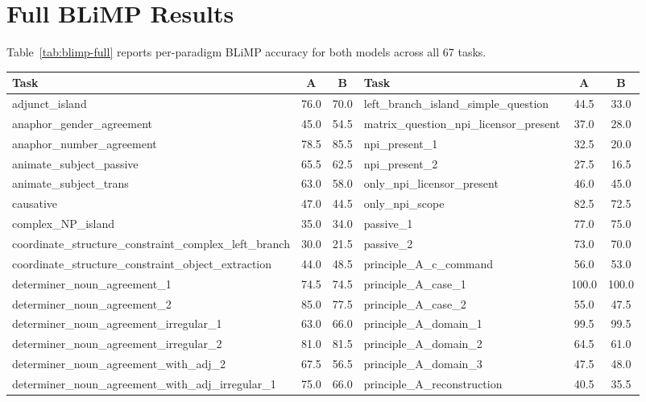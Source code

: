 \documentclass[11pt]{article}
\begin{document}



\appendix
\section{Full BLiMP Results}
\label{sec:appendix-blimp}
Table~\ref{tab:blimp-full} reports per-paradigm BLiMP accuracy for both models across all 67 tasks.

\begin{table}[t]
\centering
\tiny
\setlength{\tabcolsep}{3pt}
\begin{tabular}{lcc|lcc}
\toprule
\textbf{Task} & \textbf{A} & \textbf{B} & \textbf{Task} & \textbf{A} & \textbf{B} \\
\midrule
adjunct\_island & 76.0 & 70.0 & left\_branch\_island\_simple\_question & 44.5 & 33.0 \\
anaphor\_gender\_agreement & 45.0 & 54.5 & matrix\_question\_npi\_licensor\_present & 37.0 & 28.0 \\
anaphor\_number\_agreement & 78.5 & 85.5 & npi\_present\_1 & 32.5 & 20.0 \\
animate\_subject\_passive & 65.5 & 62.5 & npi\_present\_2 & 27.5 & 16.5 \\
animate\_subject\_trans & 63.0 & 58.0 & only\_npi\_licensor\_present & 46.0 & 45.0 \\
causative & 47.0 & 44.5 & only\_npi\_scope & 82.5 & 72.5 \\
complex\_NP\_island & 35.0 & 34.0 & passive\_1 & 77.0 & 75.0 \\
coordinate\_structure\_constraint\_complex\_left\_branch & 30.0 & 21.5 & passive\_2 & 73.0 & 70.0 \\
coordinate\_structure\_constraint\_object\_extraction & 44.0 & 48.5 & principle\_A\_c\_command & 56.0 & 53.0 \\
determiner\_noun\_agreement\_1 & 74.5 & 74.5 & principle\_A\_case\_1 & 100.0 & 100.0 \\
determiner\_noun\_agreement\_2 & 85.0 & 77.5 & principle\_A\_case\_2 & 55.0 & 47.5 \\
determiner\_noun\_agreement\_irregular\_1 & 63.0 & 66.0 & principle\_A\_domain\_1 & 99.5 & 99.5 \\
determiner\_noun\_agreement\_irregular\_2 & 81.0 & 81.5 & principle\_A\_domain\_2 & 64.5 & 61.0 \\
determiner\_noun\_agreement\_with\_adj\_2 & 67.5 & 56.5 & principle\_A\_domain\_3 & 47.5 & 48.0 \\
determiner\_noun\_agreement\_with\_adj\_irregular\_1 & 75.0 & 66.0 & principle\_A\_reconstruction & 40.5 & 35.5 \\

\end{tabular}
\end{table}
\end{document}
